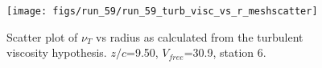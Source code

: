 \begin{figure}[H]
\centering
\texttt{[image: figs/run\_59/run\_59\_turb\_visc\_vs\_r\_meshscatter]}
\caption{Scatter plot of $\nu_T$ vs radius as calculated from the turbulent viscosity hypothesis. $z/c$=9.50, $V_{free}$=30.9, station 6.}
\label{fig:run_59_turb_visc_vs_r_meshscatter}
\end{figure}


